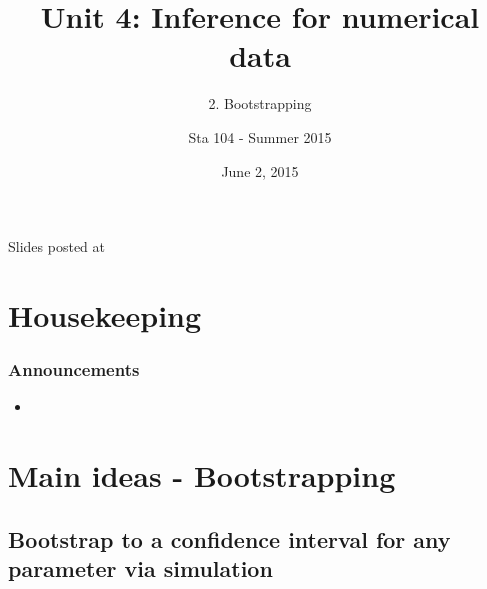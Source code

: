 \documentclass[slidestop,compress,mathserif,12pt,t,professionalfonts,xcolor=table]{beamer}
\title{Unit 4: Inference for numerical data}
\subtitle{2. Bootstrapping}
\author{Sta 104 - Summer 2015}
\date{June 2, 2015}
\institute{Duke University, Department of Statistical Science}
\begin{document}



\begin{frame}[plain]

\titlepage
\vfill
{\scriptsize {} \hfill Slides posted at  \webLink{\CourseSite}{\CourseSite}}
\addtocounter{framenumber}{-1} 

\end{frame}


\section{Housekeeping}


\begin{frame}
\frametitle{Announcements}

\begin{itemize}

\item 

\end{itemize}

\end{frame}


\section{Main ideas - Bootstrapping}


\subsection{Bootstrap to a confidence interval for any parameter via simulation}
\label{mi1boot}

\end{document}
